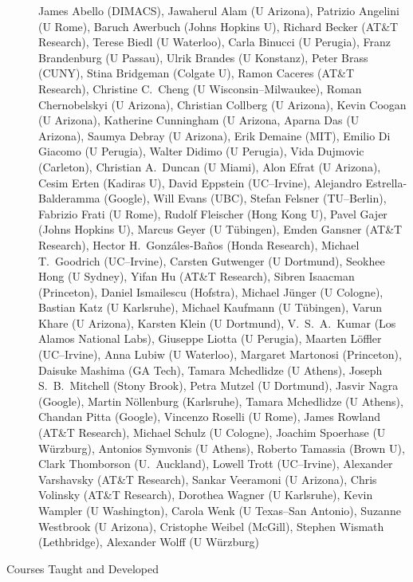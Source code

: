 \documentclass[10pt]{article}
\begin{document}
\begin{description}
James Abello (DIMACS), Jawaherul Alam (U Arizona), Patrizio Angelini
(U Rome), Baruch Awerbuch (Johns Hopkins U), Richard Becker (AT\&T Research), Terese Biedl (U
Waterloo), Carla Binucci (U Perugia), Franz Brandenburg (U Passau), Ulrik Brandes (U Konstanz), Peter Brass (CUNY), Stina Bridgeman
(Colgate U), Ramon Caceres (AT\&T Research), Christine C.~Cheng (U
Wisconsin--Milwaukee), Roman Chernobelskyi (U Arizona), Christian Collberg (U Arizona), Kevin Coogan (U
Arizona), Katherine Cunningham (U Arizona, Aparna Das (U Arizona), Saumya Debray (U Arizona), 
Erik Demaine (MIT), Emilio Di Giacomo (U Perugia), Walter Didimo (U Perugia), Vida Dujmovic (Carleton), Christian A.~Duncan (U Miami), Alon Efrat (U Arizona),  Cesim Erten (Kadiras U),
David Eppstein (UC--Irvine), Alejandro Estrella-Balderamma (Google),
Will Evans (UBC), Stefan Felsner (TU--Berlin), Fabrizio Frati (U Rome), Rudolf Fleischer (Hong Kong U), Pavel Gajer (Johns
Hopkins U), Marcus Geyer (U T{\"u}bingen), Emden Gansner (AT\&T Research), Hector H.~Gonz{\'a}les-Ba{\~n}os (Honda Research),
Michael T.~Goodrich (UC--Irvine), Carsten Gutwenger (U Dortmund), Seokhee Hong (U Sydney), Yifan Hu (AT\&T Research), Sibren Isaacman (Princeton), Daniel Ismailescu (Hofstra), Michael J{\"u}nger (U Cologne), Bastian Katz (U Karlsruhe), Michael Kaufmann (U T{\"u}bingen), Varun Khare (U Arizona), Karsten Klein  (U Dortmund), V.~S.~A.~Kumar
(Los Alamos National Labs), Giuseppe Liotta (U Perugia), Maarten
L\"offler (UC--Irvine), Anna Lubiw (U Waterloo), Margaret Martonosi
(Princeton), Daisuke Mashima (GA Tech), Tamara Mchedlidze (U Athens),
Joseph S.~B.~Mitchell (Stony Brook), Petra Mutzel (U Dortmund), Jasvir
Nagra (Google), Martin N{\"o}llenburg (Karlsruhe), Tamara Mchedlidze (U Athens), Chandan Pitta (Google),
Vincenzo Roselli (U Rome), James Rowland
(AT\&T Research), Michael Schulz (U Cologne), Joachim Spoerhase (U
W\"urzburg), Antonios Symvonis (U Athens), Roberto Tamassia
(Brown U), Clark Thomborson (U.~Auckland), Lowell Trott (UC--Irvine), Alexander Varshavsky (AT\&T Research), Sankar Veeramoni (U Arizona), Chris Volinsky (AT\&T Research), Dorothea Wagner (U Karlsruhe), Kevin Wampler (U Washington), Carola Wenk (U Texas--San Antonio),
Suzanne Westbrook (U Arizona), Cristophe Weibel (McGill), Stephen
Wismath (Lethbridge), Alexander Wolff (U W\"urzburg)


\vspace{-.1cm}\item [Courses Taught and Developed]\
	

\end{description}
\end{document}
